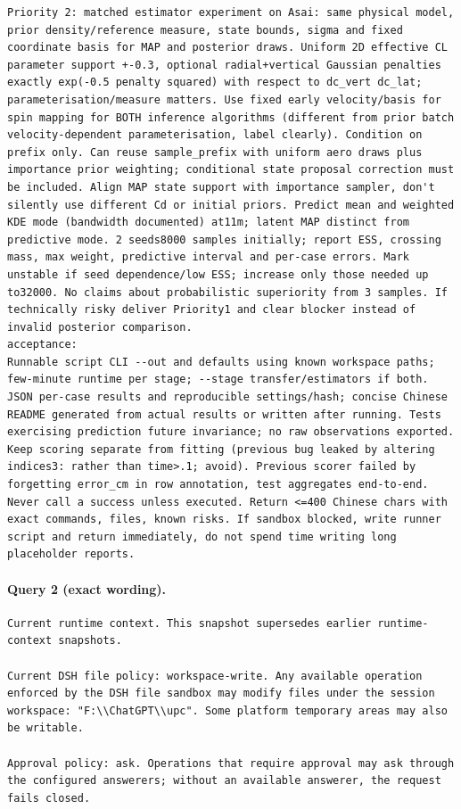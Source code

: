 \documentclass[UTF8,10pt]{ctexart}
\begin{document}
\begin{Verbatim}[breaklines=true,breakanywhere=true,fontsize=\scriptsize,frame=single,framesep=2pt]
Priority 2: matched estimator experiment on Asai: same physical model, prior density/reference measure, state bounds, sigma and fixed coordinate basis for MAP and posterior draws. Uniform 2D effective CL parameter support +-0.3, optional radial+vertical Gaussian penalties exactly exp(-0.5 penalty squared) with respect to dc_vert dc_lat; parameterisation/measure matters. Use fixed early velocity/basis for spin mapping for BOTH inference algorithms (different from prior batch velocity-dependent parameterisation, label clearly). Condition on prefix only. Can reuse sample_prefix with uniform aero draws plus importance prior weighting; conditional state proposal correction must be included. Align MAP state support with importance sampler, don't silently use different Cd or initial priors. Predict mean and weighted KDE mode (bandwidth documented) at11m; latent MAP distinct from predictive mode. 2 seeds8000 samples initially; report ESS, crossing mass, max weight, predictive interval and per-case errors. Mark unstable if seed dependence/low ESS; increase only those needed up to32000. No claims about probabilistic superiority from 3 samples. If technically risky deliver Priority1 and clear blocker instead of invalid posterior comparison.
acceptance:
Runnable script CLI --out and defaults using known workspace paths; few-minute runtime per stage; --stage transfer/estimators if both. JSON per-case results and reproducible settings/hash; concise Chinese README generated from actual results or written after running. Tests exercising prediction future invariance; no raw observations exported. Keep scoring separate from fitting (previous bug leaked by altering indices3: rather than time>.1; avoid). Previous scorer failed by forgetting error_cm in row annotation, test aggregates end-to-end. Never call a success unless executed. Return <=400 Chinese chars with exact commands, files, known risks. If sandbox blocked, write runner script and return immediately, do not spend time writing long placeholder reports.
\end{Verbatim}

\paragraph{Query 2 (exact wording).}
\begin{Verbatim}[breaklines=true,breakanywhere=true,fontsize=\scriptsize,frame=single,framesep=2pt]
Current runtime context. This snapshot supersedes earlier runtime-context snapshots.

Current DSH file policy: workspace-write. Any available operation enforced by the DSH file sandbox may modify files under the session workspace: "F:\\ChatGPT\\upc". Some platform temporary areas may also be writable.

Approval policy: ask. Operations that require approval may ask through the configured answerers; without an available answerer, the request fails closed.
\end{Verbatim}
\end{document}
